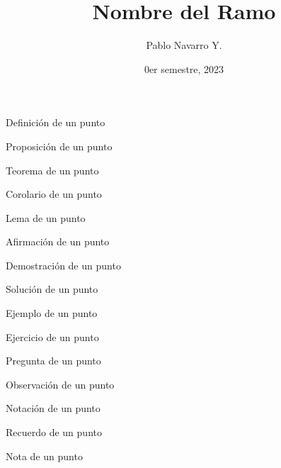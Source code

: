 \documentclass{apuntes}
\title{Nombre del Ramo}
\author{Pablo Navarro Y.}
\date{0er semestre, 2023}
\begin{document}
\renewcommand{\onlyinsubfile}[1]{}
\renewcommand{\notinsubfile}[1]{#1}

\maketitle

\begin{definicion}
  Definición de un punto
\end{definicion}

\begin{prop}
  Proposición de un punto
\end{prop}

\begin{teorema}
  Teorema de un punto
\end{teorema}

\begin{corolario}
  Corolario de un punto
\end{corolario}

\begin{lema}
  Lema de un punto
\end{lema}

\begin{aff}
  Afirmación de un punto
\end{aff}

\begin{dem}
  Demostración de un punto
\end{dem}

\begin{sol}
  Solución de un punto
\end{sol}

\begin{ejemplo}
  Ejemplo de un punto
\end{ejemplo}

\begin{ejercicio}
  Ejercicio de un punto
\end{ejercicio}

\begin{pregunta}
  Pregunta de un punto
\end{pregunta}

\begin{obs}
  Observación de un punto
\end{obs}

\begin{notacion}
  Notación de un punto
\end{notacion}

\begin{recuerdo}
  Recuerdo de un punto
\end{recuerdo}

\begin{nota}
  Nota de un punto
\end{nota}
\end{document}
